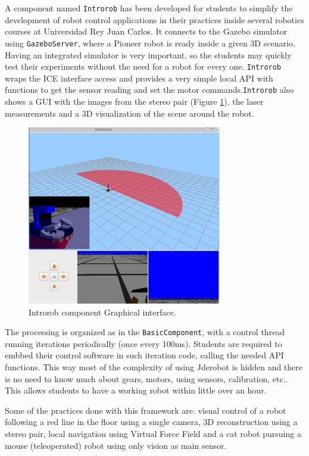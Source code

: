 \documentclass[twocolumn]{svjour3}          %
\begin{document}
A component named \texttt{Introrob} has been developed for students to simplify the development of robot control applications in their practices inside several robotics courses at Universidad Rey Juan Carlos. It connects to the Gazebo simulator using \texttt{GazeboServer}, where a Pioneer robot is ready inside a given 3D scenario. Having an integrated simulator is very important, so the students may quickly test their experiments without the need for a robot for every one. \texttt{Introrob} wraps the ICE interface access and provides a very simple local API with functions to get the sensor reading and set the motor commands.\texttt{Introrob} also shows a GUI with the images from the stereo pair (Figure \ref{fig:introrob}), the laser measurements and a 3D visualization of the scene around the robot. 

\begin{figure}[h!]
  \includegraphics[width=8.5cm]{figs/introrob.jpg}
\caption{Introrob component Graphical interface.}
\label{fig:introrob}
\end{figure}

The processing is organized as in the \texttt{BasicComponent}, with a control thread running iterations periodically (once every 100ms). Students are required to embbed their control software in such iteration code, calling the needed API functions. This way most of the complexity of using Jderobot is hidden and there is no need to know much about gears, motors, using sensors, calibration, etc.. This allows students to have a working robot within little over an hour. 

Some of the practices done with this framework are: visual control of a robot following a red line in the floor using a single camera, 3D reconstruction using a stereo pair, local navigation using Virtual Force Field and a cat robot pursuing a mouse (teleoperated) robot using only vision as main sensor.
\end{document}
